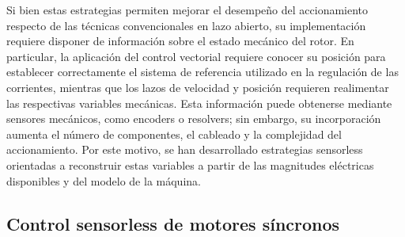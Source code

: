 %
%
%
%



%
%
%


Si bien estas estrategias permiten mejorar el desempeño del accionamiento respecto de las técnicas convencionales en lazo abierto, su implementación requiere disponer de información sobre el estado mecánico del rotor. En particular, la aplicación del control vectorial requiere conocer su posición para establecer correctamente el sistema de referencia utilizado en la regulación de las corrientes, mientras que los lazos de velocidad y posición requieren realimentar las respectivas variables mecánicas. Esta información puede obtenerse mediante sensores mecánicos, como encoders o resolvers; sin embargo, su incorporación aumenta el número de componentes, el cableado y la complejidad del accionamiento. Por este motivo, se han desarrollado estrategias sensorless orientadas a reconstruir estas variables a partir de las magnitudes eléctricas disponibles y del modelo de la máquina.



\subsection{Control sensorless de motores síncronos}

%
%
%
%
%
%


